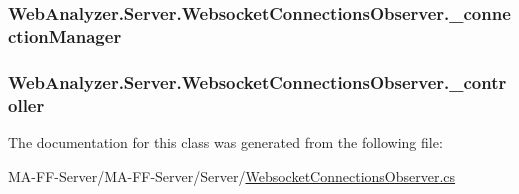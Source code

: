 \subsubsection[{\+\_\+connection\+Manager}]{ Web\+Analyzer.\+Server.\+Websocket\+Connections\+Observer.\+\_\+connection\+Manager\hspace{0.3cm}{\ttfamily [private]}}\label{class_web_analyzer_1_1_server_1_1_websocket_connections_observer_a12deecceed19d790d4f3a07bb121f519}
\hypertarget{class_web_analyzer_1_1_server_1_1_websocket_connections_observer_ac4ce45307e4d81fc6902369aacd6fb0f}{}
\subsubsection[{\+\_\+controller}]{ Web\+Analyzer.\+Server.\+Websocket\+Connections\+Observer.\+\_\+controller\hspace{0.3cm}{\ttfamily [private]}}\label{class_web_analyzer_1_1_server_1_1_websocket_connections_observer_ac4ce45307e4d81fc6902369aacd6fb0f}


The documentation for this class was generated from the following file\+:\begin{DoxyCompactItemize}
\item 
M\+A-\/\+F\+F-\/\+Server/\+M\+A-\/\+F\+F-\/\+Server/\+Server/\hyperlink{_websocket_connections_observer_8cs}{Websocket\+Connections\+Observer.\+cs}\end{DoxyCompactItemize}

